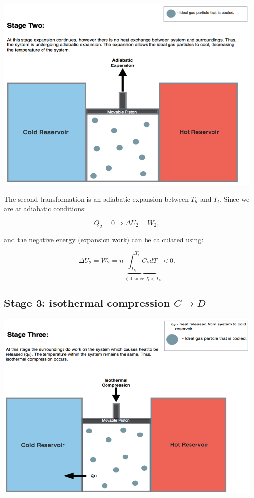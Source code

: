 \documentclass[
  9pt,
]{extbook}
\theoremstyle{definition}
\theoremstyle{definition}
\theoremstyle{definition}
\theoremstyle{definition}
\theoremstyle{remark}
\begin{document}
\begin{center}\includegraphics[width=0.7\linewidth]{./img/OEP_Figures.007b} \end{center}

The second transformation is an adiabatic expansion between \(T_h\) and \(T_l\). Since we are at adiabatic conditions:

\begin{equation}
Q_2 = 0 \Rightarrow \Delta U_2 = W_2,
  \label{eq:CCst2}
\end{equation}

and the negative energy (expansion work) can be calculated using:

\begin{equation}
\Delta U_2 = W_2 = n \underbrace{\int_{T_h}^{T_l} C_V dT}_{<0 \text{ since } T_\mathrm{l}<T_\mathrm{h}} < 0.
  \label{eq:CCst2b}
\end{equation}

\subsection{\texorpdfstring{Stage 3: isothermal compression \(C \rightarrow D\)}{Stage 3: isothermal compression C \textbackslash rightarrow D}}\label{CCstage3}

\begin{center}\includegraphics[width=0.7\linewidth]{./img/OEP_Figures.007c} \end{center}
\end{document}
